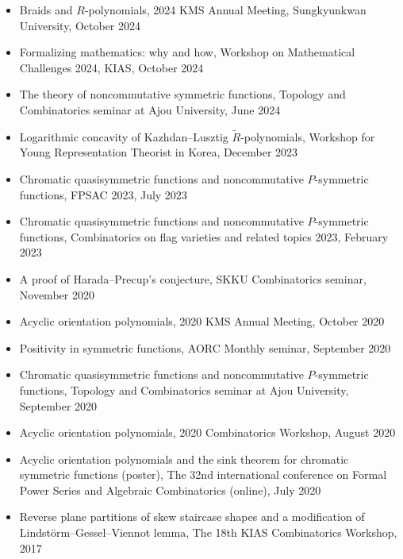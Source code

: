\documentclass[letterpaper,11pt]{article}
\begin{document}
\begin{itemize}
  \item Braids and \( R \)-polynomials, 2024 KMS Annual Meeting, Sungkyunkwan University, October 2024
  
  \item Formalizing mathematics: why and how, Workshop on Mathematical Challenges 2024, KIAS, October 2024
  
  \item The theory of noncommutative symmetric functions, Topology and Combinatorics seminar at Ajou University, June 2024
  
  \item Logarithmic concavity of Kazhdan--Lusztig \( \widetilde{R} \)-polynomials, Workshop for Young Representation Theorist in Korea, December 2023

  \item Chromatic quasisymmetric functions and noncommutative $P$-symmetric functions, FPSAC 2023, July 2023
  
  \item Chromatic quasisymmetric functions and noncommutative $P$-symmetric functions, Combinatorics on flag varieties and related topics 2023, February 2023
  
  \item A proof of Harada--Precup's conjecture, SKKU Combinatorics seminar, November 2020

  \item Acyclic orientation polynomials, 2020 KMS Annual Meeting, October 2020

  \item Positivity in symmetric functions, AORC Monthly seminar, September 2020
  
  \item Chromatic quasisymmetric functions and noncommutative $P$-symmetric functions, Topology and Combinatorics seminar at Ajou University, September 2020

  \item Acyclic orientation polynomials, 2020 Combinatorics Workshop, August 2020

  \item Acyclic orientation polynomials and the sink theorem for chromatic symmetric functions (poster), The 32nd international conference on Formal Power Series and Algebraic Combinatorics (online), July 2020

  \item Reverse plane partitions of skew staircase shapes and a modification of Lindst\"orm--Gessel--Viennot lemma, The 18th KIAS Combinatorics Workshop, 2017
\end{itemize}
\end{document}
